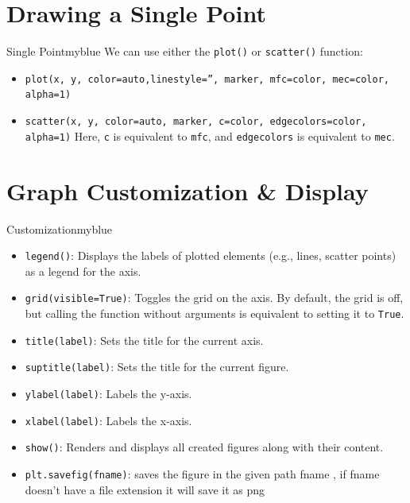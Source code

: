 \newpage

\section{Drawing a Single Point}
\begin{prettyBox}{Single Point}{myblue}
We can use either the \texttt{plot()} or \texttt{scatter()} function:
\begin{itemize}
    \item \texttt{plot(x, y, color=auto,linestyle='', marker, mfc=color, mec=color, alpha=1)}
    \item \texttt{scatter(x, y, color=auto, marker, c=color, edgecolors=color, alpha=1)}  
          Here, \texttt{c} is equivalent to \texttt{mfc}, and \texttt{edgecolors} is equivalent to \texttt{mec}.
\end{itemize}
\end{prettyBox}

\vspace{0.5cm}

\section{Graph Customization \& Display}
\begin{prettyBox}{Customization}{myblue}
\begin{itemize}
    \item \texttt{legend()}: Displays the labels of plotted elements (e.g., lines, scatter points) as a legend for the axis.
    \item \texttt{grid(visible=True)}: Toggles the grid on the axis. By default, the grid is off, but calling the function without arguments is equivalent to setting it to \texttt{True}.
    \item \texttt{title(label)}: Sets the title for the current axis.
    \item \texttt{suptitle(label)}: Sets the title for the current figure.
    \item \texttt{ylabel(label)}: Labels the y-axis.
    \item \texttt{xlabel(label)}: Labels the x-axis.
    \item \texttt{show()}: Renders and displays all created figures along with their content.
    \item \texttt{plt.savefig(fname)}: saves the figure in the given path fname , if fname doesn't have a file extension it will save it as png
\end{itemize}
\end{prettyBox}

